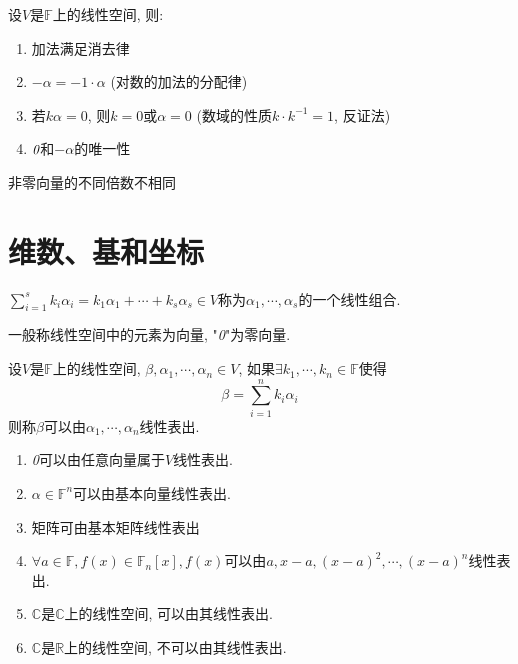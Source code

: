 \begin{property}
    设$V$是$\mathbb{F}$上的线性空间, 则:
    \begin{enumerate}[itemindent=1em]
        \item 加法满足消去律
        \item $-\alpha = -1 \cdot \alpha$ (对数的加法的分配律)
        \item 若$k\alpha=0$, 则$k=0$或$\alpha=0$ (数域的性质$k \cdot k^{-1}=1$, 反证法)
        \item $\emph{0}$和$-\alpha$的唯一性
    \end{enumerate}
\end{property}

\begin{inference}
    非零向量的不同倍数不相同
\end{inference}

\section{ 维数、基和坐标 }

\begin{definition}[线性组合]
    $\sum^s_{i=1}k_i\alpha{_i} = k_1\alpha{_1} + \cdots + k_s\alpha{_s} \in V$称为$\alpha{_1}, \cdots, \alpha{_s}$的一个线性组合.
\end{definition}

一般称线性空间中的元素为向量, "\emph{0}"为零向量.

\begin{definition}[线性表出]
    设$V$是$\mathbb{F}$上的线性空间, $\beta, \alpha{_1}, \cdots, \alpha{_n} \in V$, 如果$\exists k_1, \cdots, k_n \in \mathbb{F}$使得
    \[\beta = \sum^n_{i=1}k_i\alpha{_i}\]
    则称$\beta$可以由$\alpha{_1}, \cdots, \alpha{_n}$线性表出.
\end{definition}

\begin{example}
    \par
    \begin{enumerate}[itemindent=1em]
        \item \emph{0}可以由任意向量属于$V$线性表出.
        \item $\alpha \in \mathbb{F}^n$可以由基本向量线性表出.
        \item 矩阵可由基本矩阵线性表出
        \item $\forall a \in \mathbb{F}, f(x) \in \mathbb{F}_n[x], f(x)$可以由$a, x-a, (x-a)^2, \cdots, (x-a)^n$线性表出.
        \item $\mathbb{C}$是$\mathbb{C}$上的线性空间, 可以由其线性表出.
        \item $\mathbb{C}$是$\mathbb{R}$上的线性空间, 不可以由其线性表出.
    \end{enumerate}
\end{example}

